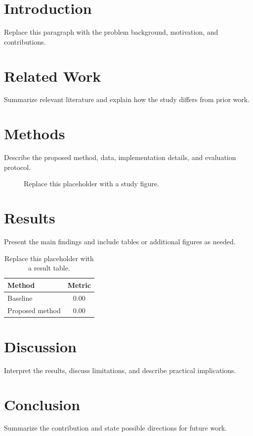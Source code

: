 
\section{Introduction}
\label{sec:introduction}
Replace this paragraph with the problem background, motivation, and contributions.

\section{Related Work}
\label{sec:related-work}
Summarize relevant literature and explain how the study differs from prior work.

\section{Methods}
\label{sec:methods}
Describe the proposed method, data, implementation details, and evaluation protocol.

\begin{figure}[htbp]
  \centering
  \fbox{\rule{0pt}{35mm}\rule{0.85\linewidth}{0pt}}
  \caption{Replace this placeholder with a study figure.}
  \label{fig:placeholder}
\end{figure}

\section{Results}
\label{sec:results}
Present the main findings and include tables or additional figures as needed.

\begin{table}[htbp]
  \centering
  \caption{Replace this placeholder with a result table.}
  \label{tab:placeholder}
  \begin{tabular}{lc}
    \hline
    Method & Metric \\
    \hline
    Baseline & 0.00 \\
    Proposed method & 0.00 \\
    \hline
  \end{tabular}
\end{table}

\section{Discussion}
\label{sec:discussion}
Interpret the results, discuss limitations, and describe practical implications.

\section{Conclusion}
\label{sec:conclusion}
Summarize the contribution and state possible directions for future work.
